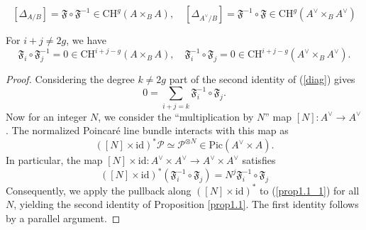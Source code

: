 \documentclass[10pt,a4paper]{amsart}
\newcommand{\CP}{{\mathcal P}}
\begin{document}
\begin{equation}\label{diag}
[\Delta_{A/B}] = \mathfrak{F} \circ \mathfrak{F}^{-1} \in \mathrm{CH}^g(A \times_B A), \quad [\Delta_{A^\vee/B}] = \mathfrak{F}^{-1} \circ \mathfrak{F} \in \mathrm{CH}^g(A^\vee\times_B A^\vee)
\end{equation}

\begin{prop} \label{prop1.1}
For $i+j \neq 2g$, we have
\[
\mathfrak{F}_i\circ \mathfrak{F}^{-1}_{j}=0 \in \mathrm{CH}^{i+j-g}(A \times_B A), \quad \mathfrak{F}^{-1}_i \circ \mathfrak{F}_j = 0 \in \mathrm{CH}^{i+j-g}(A^\vee\times_B A^\vee).
\]
\end{prop}

\begin{proof}
Considering the degree $k\neq 2g$ part of the second identity of (\ref{diag}) gives
\begin{equation}\label{prop1.1_1}
0 = \sum_{i+j=k} \mathfrak{F}^{-1}_i\circ \mathfrak{F}_{j}.
\end{equation}
Now for an integer $N$, we consider the ``multiplication by $N$'' map $[N]: A^\vee \to A^\vee$. The normalized Poincar\'e line bundle interacts with this map as
\[
\left([N] \times \mathrm{id}\right)^* \CP \simeq \CP^{\otimes N} \in \mathrm{Pic}\left( A^\vee \times A \right).
\]
In particular, the map $[N]\times \mathrm{id}: A^\vee\times A^\vee \to A^\vee\times A^\vee$ satisfies
\[
([N] \times \mathrm{id})^* \left( \mathfrak{F}^{-1}_i\circ \mathfrak{F}_j\right) = N^j\mathfrak{F}^{-1}_i\circ \mathfrak{F}_j
\]
Consequently, we apply the pullback along $([N] \times \mathrm{id})^*$ to (\ref{prop1.1_1}) for all $N$, yielding the second identity of Proposition \ref{prop1.1}. The first identity follows by a parallel argument.
\end{proof}
\end{document}
